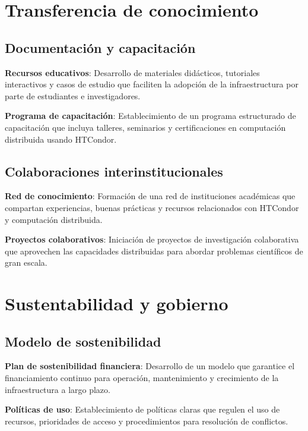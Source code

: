 \section{Transferencia de conocimiento}
\noindent

\subsection{Documentación y capacitación}
\noindent

\textbf{Recursos educativos}: Desarrollo de materiales didácticos, tutoriales interactivos y casos de estudio que faciliten la adopción de la infraestructura por parte de estudiantes e investigadores.

\textbf{Programa de capacitación}: Establecimiento de un programa estructurado de capacitación que incluya talleres, seminarios y certificaciones en computación distribuida usando HTCondor.

\subsection{Colaboraciones interinstitucionales}
\noindent

\textbf{Red de conocimiento}: Formación de una red de instituciones académicas que compartan experiencias, buenas prácticas y recursos relacionados con HTCondor y computación distribuida.

\textbf{Proyectos colaborativos}: Iniciación de proyectos de investigación colaborativa que aprovechen las capacidades distribuidas para abordar problemas científicos de gran escala.

\section{Sustentabilidad y gobierno}
\noindent

\subsection{Modelo de sostenibilidad}
\noindent

\textbf{Plan de sostenibilidad financiera}: Desarrollo de un modelo que garantice el financiamiento continuo para operación, mantenimiento y crecimiento de la infraestructura a largo plazo.

\textbf{Políticas de uso}: Establecimiento de políticas claras que regulen el uso de recursos, prioridades de acceso y procedimientos para resolución de conflictos.

